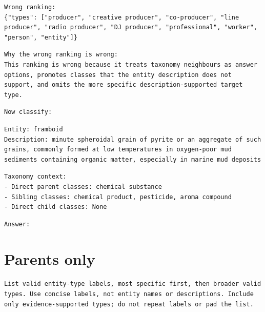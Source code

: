 \begin{Verbatim}[fontsize=\footnotesize,breaklines=true,breakanywhere=true]
Wrong ranking:
{"types": ["producer", "creative producer", "co-producer", "line producer", "radio producer", "DJ producer", "professional", "worker", "person", "entity"]}
\end{Verbatim}

\begin{Verbatim}[fontsize=\footnotesize,breaklines=true,breakanywhere=true]
Why the wrong ranking is wrong:
This ranking is wrong because it treats taxonomy neighbours as answer options, promotes classes that the entity description does not support, and omits the more specific description-supported target type.
\end{Verbatim}

\begin{Verbatim}[fontsize=\footnotesize,breaklines=true,breakanywhere=true]
Now classify:
\end{Verbatim}

\begin{Verbatim}[fontsize=\footnotesize,breaklines=true,breakanywhere=true]
Entity: framboid
Description: minute spheroidal grain of pyrite or an aggregate of such grains, commonly formed at low temperatures in oxygen-poor mud sediments containing organic matter, especially in marine mud deposits
\end{Verbatim}

\begin{Verbatim}[fontsize=\footnotesize,breaklines=true,breakanywhere=true]
Taxonomy context:
- Direct parent classes: chemical substance
- Sibling classes: chemical product, pesticide, aroma compound
- Direct child classes: None
\end{Verbatim}

\begin{Verbatim}[fontsize=\footnotesize,breaklines=true,breakanywhere=true]
Answer:
\end{Verbatim}

\clearpage

\section{Parents only}

\begin{Verbatim}[fontsize=\footnotesize,breaklines=true,breakanywhere=true]
List valid entity-type labels, most specific first, then broader valid types. Use concise labels, not entity names or descriptions. Include only evidence-supported types; do not repeat labels or pad the list.
\end{Verbatim}

